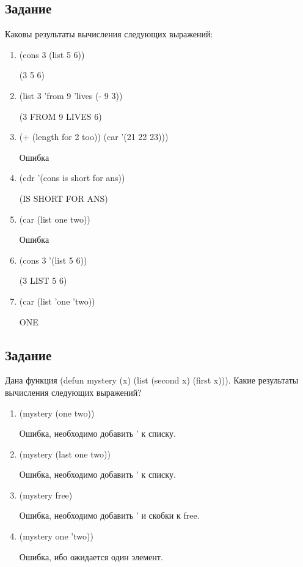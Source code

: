 \subsection{Задание }

Каковы результаты вычисления следующих выражений:
\begin{enumerate}[label*=\arabic*.]
	\item (cons 3 (list 5 6))
	
	(3 5 6)

	\item (list 3 'from 9 'lives (- 9 3))
	
	(3 FROM 9 LIVES 6)
	
	\item (+ (length for 2 too)) (car '(21 22 23)))
	
	Ошибка
	
	\item (cdr '(cons is short for ans))
	
	(IS SHORT FOR ANS)
	
	\item (car (list one two))
	
	Ошибка
	
	\item (cons 3 '(list 5 6))
	
	(3 LIST 5 6)
	
	\item (car (list 'one 'two))

	ONE	
\end{enumerate} 

\subsection{Задание }

Дана функция (defun mystery (x) (list (second x) (first x))). Какие результаты вычисления следующих выражений?


\begin{enumerate}[label*=\arabic*.]
	\item (mystery (one two))
	
	Ошибка, необходимо добавить ' к списку.

	\item (mystery (last one two))
	
	Ошибка, необходимо добавить ' к списку.
	
	\item (mystery free)
	
	Ошибка, необходимо добавить '  и скобки к free.
	
	\item (mystery one 'two))
	
	Ошибка, ибо ожидается один элемент. 
	
\end{enumerate} 


